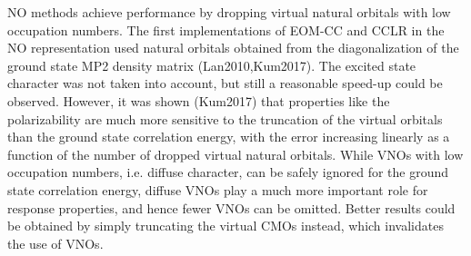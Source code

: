 NO methods achieve performance by dropping virtual natural orbitals with low occupation numbers. The first implementations of EOM-CC and CCLR in the NO representation used natural orbitals obtained from the diagonalization of the ground state MP2 density matrix (Lan2010,Kum2017). The excited state character was not taken into account, but still a reasonable speed-up could be observed. However, it was shown (Kum2017) that properties like the polarizability are much more sensitive to the truncation of the virtual orbitals than the ground state correlation energy, with the error increasing linearly as a function of the number of dropped virtual natural orbitals. While VNOs with low occupation numbers, i.e. diffuse character, can be safely  ignored for the ground state correlation energy, diffuse VNOs play a much more important role for response properties, and hence fewer VNOs can be omitted. Better results could be obtained by simply truncating the virtual CMOs instead, which invalidates the use of VNOs. 

